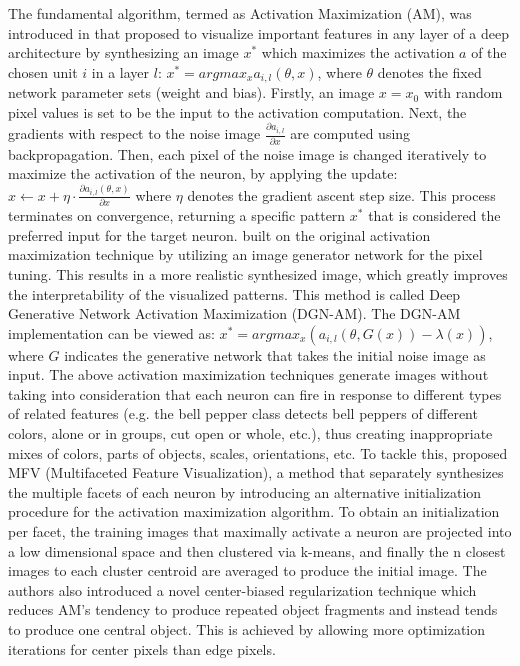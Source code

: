 \documentclass[journal]{IEEEtran}
\begin{document}
The fundamental algorithm, termed as Activation Maximization (AM), was introduced in \cite{Erhan2009} \cite{Erhan2010} that proposed to visualize important features in any layer of a deep architecture by synthesizing an image $x^*$ which maximizes the activation $a$ of the chosen unit $i$ in a layer $l$: $x^*=argmax_x a_{i,l} (\theta,x)$, where $\theta$ denotes the fixed network parameter sets (weight and bias). Firstly, an image $x=x_0$ with random pixel values is set to be the input to the activation computation. Next, the gradients with respect to the noise image $\frac{\partial{a_{i,l}}}{\partial{x}}$ are computed using backpropagation. Then, each pixel of the noise image is changed iteratively to maximize the activation of the neuron, by applying the update: $x \gets x+\eta \cdot \frac{\partial{a_{i,l}(\theta,x)}}{\partial{x}}$ where $\eta$ denotes the gradient ascent step size. This process terminates on convergence, returning a specific pattern $x^*$ that is considered the preferred input for the target neuron.  
\cite{Nguyen2016} built on the original activation maximization technique by utilizing an image generator network for the pixel tuning. This results in a more realistic synthesized image, which greatly improves the interpretability of the visualized patterns. This method is called Deep Generative Network Activation Maximization (DGN-AM). The DGN-AM implementation can be viewed as: $x^*=argmax_x (a_{i,l}(\theta,G(x))-\lambda(x))$, where $G$ indicates the generative network that takes the initial noise image as input.
The above activation maximization techniques generate images without taking into consideration that each neuron can fire in response to different types of related features (e.g. the bell pepper class detects bell peppers of different colors, alone or in groups, cut open or whole, etc.), thus creating inappropriate mixes of colors, parts of objects, scales, orientations, etc. To tackle this, \cite{Nguyen2016a} proposed MFV (Multifaceted Feature Visualization), a method that separately synthesizes the multiple facets of each neuron by introducing an alternative initialization procedure for the activation maximization algorithm. To obtain an initialization per facet, the training images that maximally activate a neuron are projected into a low dimensional space and then clustered via k-means, and finally the n closest images to each cluster centroid are averaged to produce the initial image. The authors also introduced a novel center-biased regularization technique which reduces AM’s tendency to produce repeated object fragments and instead tends to produce one central object. This is achieved by allowing more optimization iterations for center pixels than edge pixels.
\end{document}
